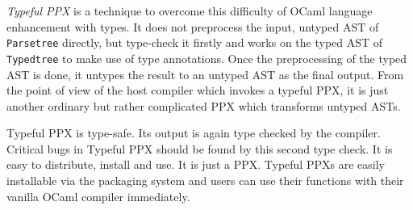 \documentclass{article}
\begin{document}
\emph{Typeful PPX} is a technique to overcome this difficulty of OCaml
language enhancement with types. It does not preprocess the input,
untyped AST of \texttt{Parsetree} directly, but type-check it firstly
and works on the typed AST of \texttt{Typedtree} to make use of type
annotations. Once the preprocessing of the typed AST is done, it untypes
the result to an untyped AST as the final output. From the point of view
of the host compiler which invokes a typeful PPX, it is just another
ordinary but rather complicated PPX which transforms untyped ASTs.
%
%

Typeful PPX is type-safe. Its output is again type checked by the compiler.
Critical bugs in Typeful PPX should be found by this second type check.
It is easy to distribute, install and use. It is just a PPX.
Typeful PPXs are easily installable via the packaging system and users
can use their functions with their vanilla OCaml compiler immediately.
% 

% 
% 
\end{document}
